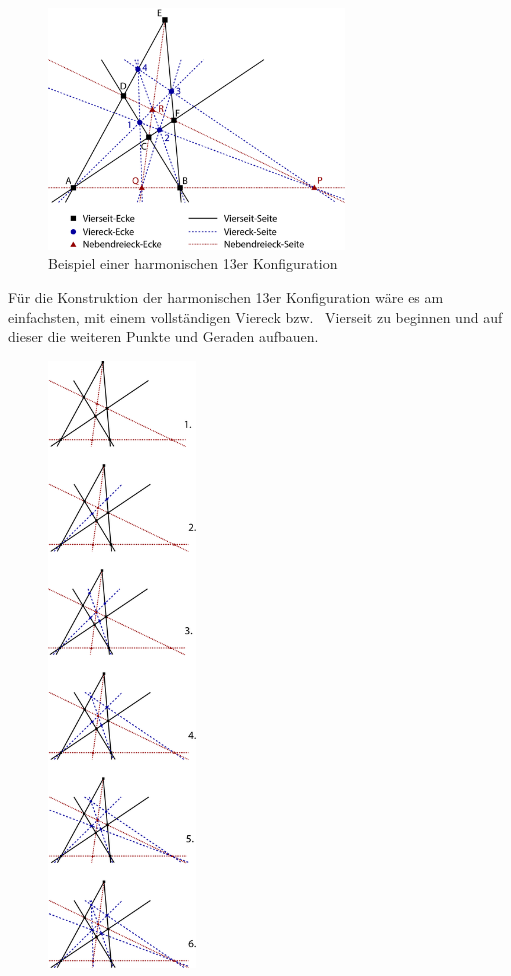 \documentclass[12pt,a4paper]{article}
\begin{document}
\begin{figure}[htbp]
\centering
\includegraphics[width=0.7\textwidth]{Bilder/13erKonfigStepbyStep.png}
\caption{Beispiel einer harmonischen 13er Konfiguration}
\label{fig:harmFigur}
\end{figure}

Für die Konstruktion der harmonischen 13er Konfiguration wäre es am einfachsten, mit einem vollständigen Viereck bzw.~ Vierseit zu beginnen und auf dieser die weiteren Punkte und Geraden aufbauen.

\begin{figure}
\centering
\includegraphics[width=0.35\textwidth]{Bilder/13erKonfigStepbyStep3.png}
\end{figure}
\end{document}
